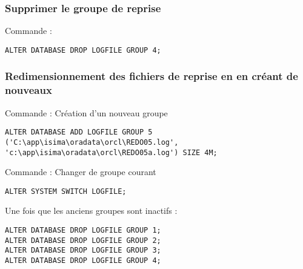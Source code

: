 \subsubsection{Supprimer le groupe de reprise}

Commande : 
\begin{verbatim}
ALTER DATABASE DROP LOGFILE GROUP 4;
\end{verbatim}


\subsubsection{Redimensionnement des fichiers de reprise en en créant de nouveaux }
Commande : Création d'un nouveau groupe
\begin{verbatim}
ALTER DATABASE ADD LOGFILE GROUP 5 ('C:\app\isima\oradata\orcl\REDO05.log', 'c:\app\isima\oradata\orcl\REDO05a.log') SIZE 4M;
\end{verbatim}

Commande : Changer de groupe courant
\begin{verbatim}
ALTER SYSTEM SWITCH LOGFILE;
\end{verbatim}

Une fois que les anciens groupes sont inactifs :
\begin{verbatim}
ALTER DATABASE DROP LOGFILE GROUP 1;
ALTER DATABASE DROP LOGFILE GROUP 2;
ALTER DATABASE DROP LOGFILE GROUP 3;
ALTER DATABASE DROP LOGFILE GROUP 4;
\end{verbatim}